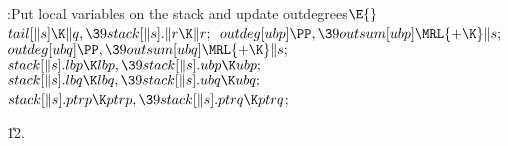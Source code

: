 \B{}:Put local variables on the stack and update
outdegrees\X${}\E{}$\6
$\\{tail}[\|s]\K\|q,\39\\{stack}[\|s].\|r\K\|r;{}$\6
${}\\{outdeg}[\\{ubp}]\PP,\39\\{outsum}[\\{ubp}]\MRL{+{\K}}\|s;{}$\6
${}\\{outdeg}[\\{ubq}]\PP,\39\\{outsum}[\\{ubq}]\MRL{+{\K}}\|s;{}$\6
${}\\{stack}[\|s].\\{lbp}\K\\{lbp},\39\\{stack}[\|s].\\{ubp}\K\\{ubp};{}$\6
${}\\{stack}[\|s].\\{lbq}\K\\{lbq},\39\\{stack}[\|s].\\{ubq}\K\\{ubq};{}$\6
${}\\{stack}[\|s].\\{ptrp}\K\\{ptrp},\39\\{stack}[\|s].\\{ptrq}\K\\{ptrq}{}$;%
\par
\U12.\fi

